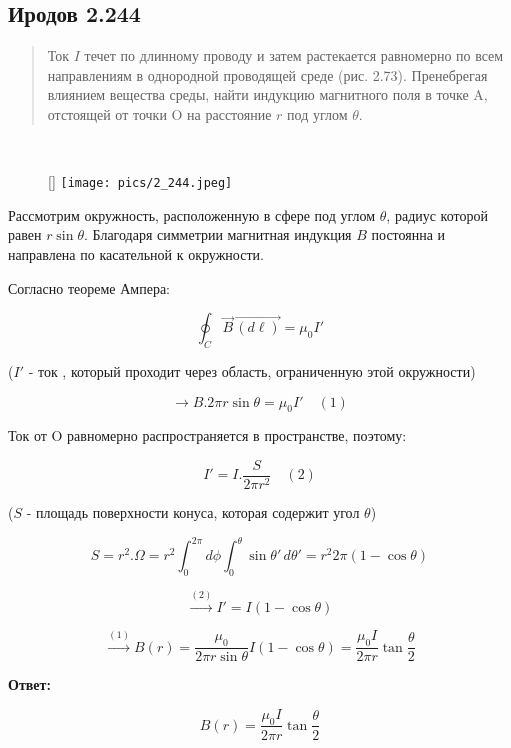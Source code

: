 \subsection*{Иродов 2.244}
\setcounter{equation}{0}

\begin{abstract}
Ток $I$ течет по длинному проводу и затем растекается равномерно по всем направлениям в однородной проводящей среде (рис. 2.73). Пренебрегая влиянием вещества среды, найти индукцию магнитного поля в точке A, отстоящей от точки O на расстояние $r$ под углом $\theta$.
\end{abstract}

\noindent \hrulefill
\\
\begin{wrapfigure}[6]{r}{0.30\textwidth}
	\raisebox{0pt}[\dimexpr{}\baselineskip\relax]{
	\texttt{[image: pics/2\_244.jpeg]}}
\end{wrapfigure}

Рассмотрим окружность, расположенную в сфере под углом $\theta$, радиус которой равен $r \sin{\theta}$. Благодаря симметрии магнитная индукция $B$ постоянна и направлена по касательной к окружности.

Согласно теореме Ампера:

$$\oint_C \vec{B} \, \vec{(d \ell)} = \mu_0 I'$$

($I'$ - ток , который проходит через область, ограниченную этой окружности)

$$\xrightarrow{} B.2 \pi r \sin{\theta} = \mu_0 I' \quad (1)$$

Ток от O равномерно распространяется в пространстве, поэтому:

$$I' = I .\frac{S}{2 \pi r^2} \quad (2)$$

($S$ - площадь поверхности конуса, которая содержит угол $\theta$)

$$S = r^2. \Omega = r^2  \int_0^{2 \pi} d \phi  \int_0^{\theta} \sin{\theta'}\, d\theta' = r^2 2 \pi (1-\cos{\theta})$$

$$\xrightarrow{(2)} I' = I (1- \cos{\theta})$$

$$\xrightarrow{(1)} B(r) = \frac{\mu_0}{2 \pi r \sin{\theta}} I (1 - \cos{\theta}) = \frac{\mu_0 I}{2 \pi r}  \tan{\frac{\theta}{2}}$$

\textbf{Ответ:}

$$ B(r) =  \frac{\mu_0 I}{2 \pi r}  \tan{\frac{\theta}{2}}$$









